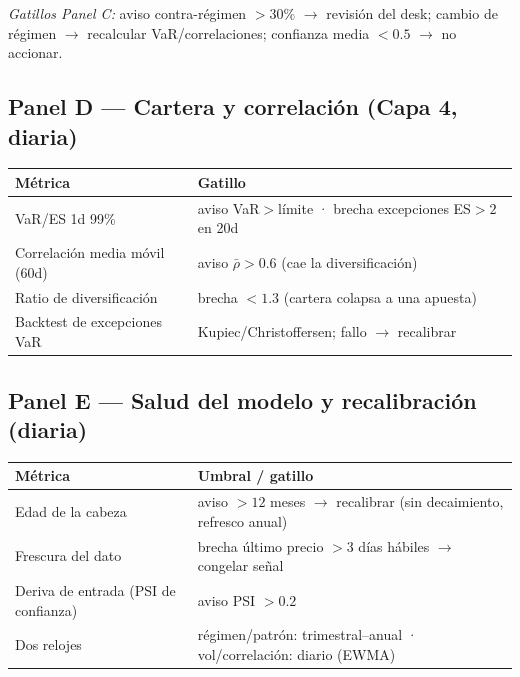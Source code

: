 \documentclass[11pt]{article}
\begin{document}
\noindent\emph{Gatillos Panel C:} aviso contra-r\'egimen $>30\%$ $\to$ revisi\'on del desk;
cambio de r\'egimen $\to$ recalcular VaR/correlaciones; confianza media $<0.5$ $\to$ no accionar.

\subsection*{Panel D --- Cartera y correlaci\'on (Capa 4, diaria)}
\begin{tabularx}{\textwidth}{L L}
\toprule \textbf{M\'etrica} & \textbf{Gatillo}\\ \midrule
VaR/ES 1d 99\% & aviso VaR$>$l\'imite · brecha excepciones ES$>2$ en 20d\\
Correlaci\'on media m\'ovil (60d) & aviso $\bar\rho>0.6$ (cae la diversificaci\'on)\\
Ratio de diversificaci\'on & brecha $<1.3$ (cartera colapsa a una apuesta)\\
Backtest de excepciones VaR & Kupiec/Christoffersen; fallo $\to$ recalibrar\\
\bottomrule
\end{tabularx}

\subsection*{Panel E --- Salud del modelo y recalibraci\'on (diaria)}
\begin{tabularx}{\textwidth}{L L}
\toprule \textbf{M\'etrica} & \textbf{Umbral / gatillo}\\ \midrule
Edad de la cabeza & aviso $>12$ meses $\to$ recalibrar (sin decaimiento, refresco anual)\\
Frescura del dato & brecha \'ultimo precio $>3$ d\'ias h\'abiles $\to$ congelar se\~nal\\
Deriva de entrada (PSI de confianza) & aviso PSI $>0.2$\\
Dos relojes & r\'egimen/patr\'on: trimestral--anual · vol/correlaci\'on: diario (EWMA)\\
\bottomrule
\end{tabularx}
\end{document}
